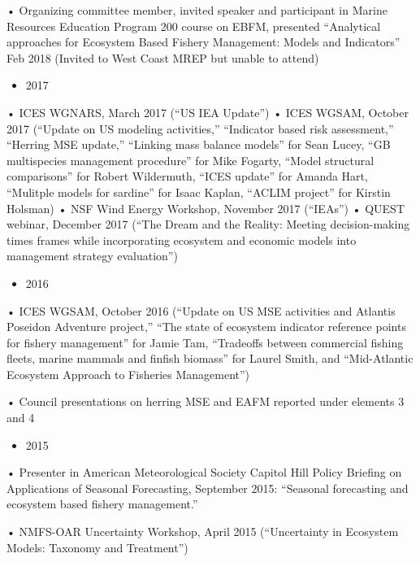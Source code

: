 \documentclass[11pt, a4paper]{awesome-cv}
\providecommand{\tightlist}{%
	\setlength{\itemsep}{0pt}\setlength{\parskip}{0pt}}
\begin{document}
• Organizing committee member, invited speaker and participant in Marine
Resources Education Program 200 course on EBFM, presented ``Analytical
approaches for Ecosystem Based Fishery Management: Models and
Indicators'' Feb 2018 (Invited to West Coast MREP but unable to attend)

\begin{itemize}
\tightlist
\item
  2017
\end{itemize}

• ICES WGNARS, March 2017 (``US IEA Update'') • ICES WGSAM, October 2017
(``Update on US modeling activities,'' ``Indicator based risk
assessment,'' ``Herring MSE update,'' ``Linking mass balance models''
for Sean Lucey, ``GB multispecies management procedure'' for Mike
Fogarty, ``Model structural comparisons'' for Robert Wildermuth, ``ICES
update'' for Amanda Hart, ``Mulitple models for sardine'' for Isaac
Kaplan, ``ACLIM project'' for Kirstin Holsman) • NSF Wind Energy
Workshop, November 2017 (``IEAs'') • QUEST webinar, December 2017 (``The
Dream and the Reality: Meeting decision-making times frames while
incorporating ecosystem and economic models into management strategy
evaluation'')

\begin{itemize}
\tightlist
\item
  2016
\end{itemize}

• ICES WGSAM, October 2016 (``Update on US MSE activities and Atlantis
Poseidon Adventure project,'' ``The state of ecosystem indicator
reference points for fishery management'' for Jamie Tam, ``Tradeoffs
between commercial fishing fleets, marine mammals and finfish biomass''
for Laurel Smith, and ``Mid-Atlantic Ecosystem Approach to Fisheries
Management'')

• Council presentations on herring MSE and EAFM reported under elements
3 and 4

\begin{itemize}
\tightlist
\item
  2015
\end{itemize}

• Presenter in American Meteorological Society Capitol Hill Policy
Briefing on Applications of Seasonal Forecasting, September 2015:
``Seasonal forecasting and ecosystem based fishery management.''

• NMFS-OAR Uncertainty Workshop, April 2015 (``Uncertainty in Ecosystem
Models: Taxonomy and Treatment'')
\end{document}
